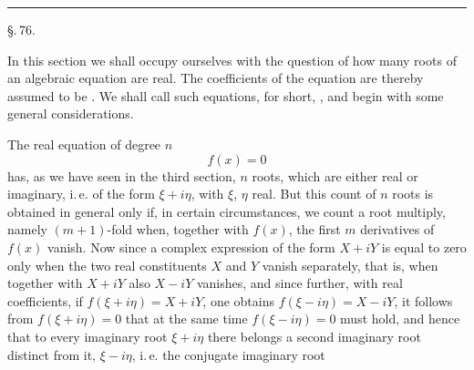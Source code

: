 
\begin{center}


\rule{3cm}{0.4pt}

\S.\,76.

\end{center}

In this section we shall occupy ourselves with the question of how many roots of an algebraic equation are real. The coefficients of the equation are thereby assumed to be . We shall call such equations, for short, , and begin with some general considerations.

The real equation of degree $n$
\[
f(x) = 0
\]
has, as we have seen in the third section, $n$ roots, which are either real or imaginary, i.\,e. of the form $\xi + i\eta$, with $\xi$, $\eta$ real. But this count of $n$ roots is obtained in general only if, in certain circumstances, we count a root multiply, namely $(m+1)$-fold when, together with $f(x)$, the first $m$ derivatives of $f(x)$ vanish. Now since a complex expression of the form $X + iY$ is equal to zero only when the two real constituents $X$ and $Y$ vanish separately, that is, when together with $X+iY$ also $X-iY$ vanishes, and since further, with real coefficients, if $f(\xi+i\eta) = X+iY$, one obtains $f(\xi-i\eta) = X-iY$, it follows from $f(\xi+i\eta)=0$ that at the same time $f(\xi-i\eta)=0$ must hold, and hence that to every imaginary root $\xi+i\eta$ there belongs a second imaginary root distinct from it, $\xi-i\eta$, i.\,e. the conjugate imaginary root
